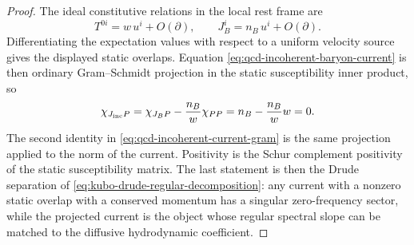 \begin{proof}
The ideal constitutive relations in the local rest frame are
\[
  T^{0i}=w\,u^i+O(\partial),\qquad
  J_B^i=n_B\,u^i+O(\partial).
\]
Differentiating the expectation values with respect to a uniform velocity
source gives the displayed static overlaps.  Equation
\eqref{eq:qcd-incoherent-baryon-current} is then ordinary Gram--Schmidt
projection in the static susceptibility inner product, so
\[
  \chi_{J_{\rm inc}P}
  =
  \chi_{J_BP}-\frac{n_B}{w}\chi_{PP}
  =
  n_B-\frac{n_B}{w}w
  =
  0.
\]
The second identity in \eqref{eq:qcd-incoherent-current-gram} is the same
projection applied to the norm of the current.  Positivity is the Schur
complement positivity of the static susceptibility matrix.  The last
statement is then the Drude separation of
\eqref{eq:kubo-drude-regular-decomposition}: any current with a nonzero
static overlap with a conserved momentum has a singular zero-frequency
sector, while the projected current is the object whose regular spectral
slope can be matched to the diffusive hydrodynamic coefficient.
\end{proof}

